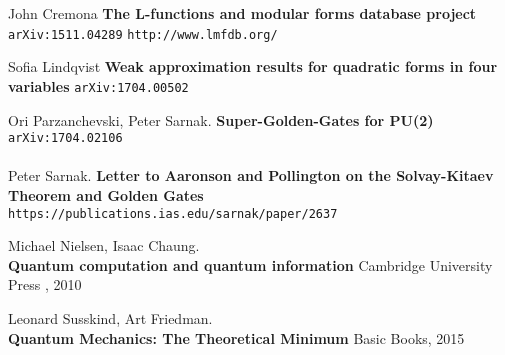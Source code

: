 \documentclass[12pt]{article}
\begin{document}
\begin{thebibliography}{}

\item John Cremona \textbf{The L-functions and modular forms database project}  \texttt{arXiv:1511.04289}  
\texttt{http://www.lmfdb.org/}

\item Sofia Lindqvist \textbf{Weak approximation results for quadratic forms in four variables} \texttt{arXiv:1704.00502}

\item Ori Parzanchevski, Peter Sarnak.  \textbf{Super-Golden-Gates for PU(2)} \texttt{arXiv:1704.02106} \\ \\
Peter Sarnak.  \textbf{Letter to Aaronson and Pollington on the Solvay-Kitaev Theorem and Golden Gates} \texttt{https://publications.ias.edu/sarnak/paper/2637}

\item Michael Nielsen, Isaac Chaung. \\ \textbf{Quantum computation and quantum information}  Cambridge University Press , 2010

\item Leonard Susskind, Art Friedman. \\ \textbf{Quantum Mechanics: The Theoretical Minimum} Basic Books, 2015
\end{thebibliography}
\end{document}

